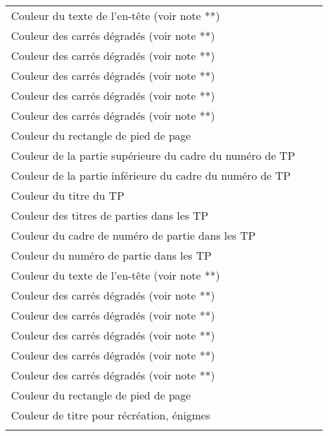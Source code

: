 \documentclass[nocrop]{sesamanuel}
\begin{document}
\begin{longtable}{@{}llp{8cm}@{}}
  {TPHeadFrame0Color}{Blanc}
  Couleur du texte de l'en-tête (voir note **)\\
  {TPHeadFrame1Color}{H1}
  Couleur des carrés dégradés (voir note **)\\
  {TPHeadFrame2Color}{H2}
  Couleur des carrés dégradés (voir note **)\\
  {TPHeadFrame3Color}{H3}
  Couleur des carrés dégradés (voir note **)\\
  {TPHeadFrame4Color}{C3}
  Couleur des carrés dégradés (voir note **)\\
  {TPHeadFrame5Color}{C2}
  Couleur des carrés dégradés (voir note **)\\
  {TPFootColor}{C3}
  Couleur du rectangle de pied de page\\
  {TPTopColor}{J3}
  Couleur de la partie supérieure du cadre du numéro de TP\\
  {TPBottomColor}{C3}
  Couleur de la partie inférieure du cadre du numéro de TP\\
  {TPTitleColor}{H1}
  Couleur du titre du TP\\
  {TPPartieColor}{J1}
  Couleur des titres de parties dans les TP\\
  {TPPartieBkgColor}{C2}
  Couleur du cadre de numéro de partie dans les TP\\
  {TPPartieNumColor}{Blanc}
  Couleur du numéro de partie dans les TP\\
  {RecreationHeadFrame0Color}{Blanc}
  Couleur du texte de l'en-tête (voir note **)\\
  {RecreationHeadFrame1Color}{J1}
  Couleur des carrés dégradés (voir note **)\\
  {RecreationHeadFrame2Color}{J2}
  Couleur des carrés dégradés (voir note **)\\
  {RecreationHeadFrame3Color}{H4}
  Couleur des carrés dégradés (voir note **)\\
  {RecreationHeadFrame4Color}{H2}
  Couleur des carrés dégradés (voir note **)\\
  {RecreationHeadFrame5Color}{H1}
  Couleur des carrés dégradés (voir note **)\\
  {RecreationFootColor}{H2}
  Couleur du rectangle de pied de page\\
  {RecreationTitleColor}{H1}
  Couleur de titre pour récréation, énigmes\\
  {RecreationItemColor}{H1}

\end{longtable}
\end{document}
